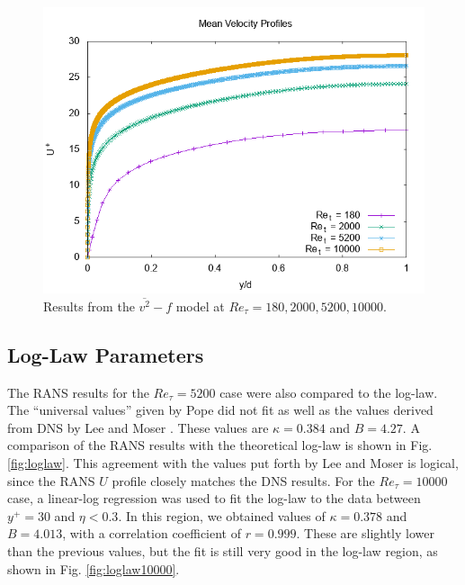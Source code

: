 \documentclass[a4paper,11pt]{article}
\begin{document}
\begin{figure}[!ht]
	\centering
	\includegraphics{All_Profiles.png}
	\caption{Results from the $\overline{v^2}-f$ model at $Re_\tau =
180,2000,5200,10000$.}
	\label{fig:all_prof}
\end{figure}


\subsection{Log-Law Parameters}

The RANS results for the $Re_{\tau} = 5200$ case were also compared to the
log-law.  The ``universal values'' given by Pope \cite{pope} did not fit as well
as the values derived from DNS by Lee and Moser \cite{Lee}.  These values are $\kappa = 0.384$ and $B = 4.27$.  A comparison of the RANS results with the theoretical log-law is shown in Fig. \ref{fig:loglaw}. This agreement with the values put forth by Lee and Moser is logical, since the RANS $U$ profile closely matches the DNS results.
For the $Re_{\tau} = 10000$ case, a linear-log regression was used to fit the log-law to the data between $y^+ = 30$ and $\eta < 0.3$.  In this region, we obtained values of $\kappa = 0.378$ and $B = 4.013$, with a correlation coefficient of $r = 0.999$.  These are slightly lower than the previous values, but the fit is still very good in the log-law region, as shown in Fig. \ref{fig:loglaw10000}.
\end{document}
